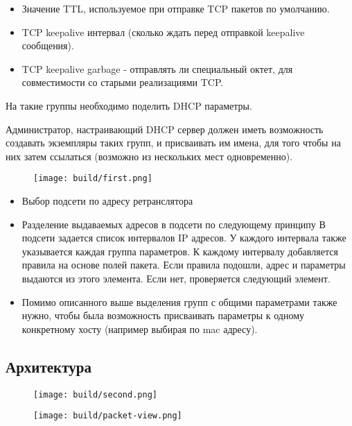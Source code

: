 \documentclass[12pt]{article}
\begin{document}
\begin{itemize}
    \item Значение TTL, используемое при отправке TCP пакетов по умолчанию.
    \item TCP keepalive интервал (сколько ждать перед отправкой keepalive сообщения).
    \item TCP keepalive garbage - отправлять ли специальный октет, для совместимости со старыми реализациями TCP.
\end{itemize}

На такие группы необходимо поделить DHCP параметры.

Администратор, настраивающий DHCP сервер должен иметь возможность создавать экземпляры таких групп, и присваивать им имена, для того чтобы на них затем ссылаться (возможно из нескольких мест одновременно).

\begin{figure}[H]
    \texttt{[image: build/first.png]}
    \caption{}
\end{figure}

\begin{itemize}
    \item Выбор подсети по адресу ретранслятора
    \item Разделение выдаваемых адресов в подсети по следующему принципу
        \subitem В подсети задается список интервалов IP адресов.
        \subitem У каждого интервала также указывается каждая группа параметров.
        \subitem К каждому интервалу добавляется правила на основе полей пакета.
        \subitem Если правила подошли, адрес и параметры выдаются из этого элемента.
        \subitem Если нет, проверяется следующий элемент.
    \item Помимо описанного выше выделения групп с общими параметрами также нужно, чтобы была возможность присваивать параметры к одному конкретному хосту (например выбирая по mac адресу).
\end{itemize}

\subsection{Архитектура}

\begin{figure}[H]
    \texttt{[image: build/second.png]}
    \caption{}
\end{figure}

\begin{figure}[H]
    \texttt{[image: build/packet-view.png]}
    \caption{}
\end{figure}
\end{document}
